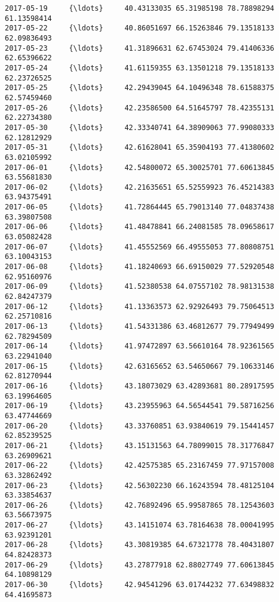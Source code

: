 \documentclass[11pt]{article}
\begin{document}
\begin{Verbatim}[commandchars=\\\{\}]
2017-05-19     {\ldots}     40.43133035 65.31985198 78.78898294 61.13598414   
2017-05-22     {\ldots}     40.86051697 66.15263846 79.13518133 62.09836493   
2017-05-23     {\ldots}     41.31896631 62.67453024 79.41406336 62.65396622   
2017-05-24     {\ldots}     41.61159355 63.13501218 79.13518133 62.23726525   
2017-05-25     {\ldots}     42.29439045 64.10496348 78.61588375 62.57459460   
2017-05-26     {\ldots}     42.23586500 64.51645797 78.42355131 62.22734380   
2017-05-30     {\ldots}     42.33340741 64.38909063 77.99080333 62.12812929   
2017-05-31     {\ldots}     42.61628041 65.35904193 77.41380602 63.02105992   
2017-06-01     {\ldots}     42.54800072 65.30025701 77.60613845 63.55681830   
2017-06-02     {\ldots}     42.21635651 65.52559923 76.45214383 63.94375491   
2017-06-05     {\ldots}     41.72864445 65.79013140 77.04837438 63.39807508   
2017-06-06     {\ldots}     41.48478841 66.24081585 78.09658617 63.05082428   
2017-06-07     {\ldots}     41.45552569 66.49555053 77.80808751 63.10043153   
2017-06-08     {\ldots}     41.18240693 66.69150029 77.52920548 62.95160976   
2017-06-09     {\ldots}     41.52380538 64.07557102 78.98131538 62.84247379   
2017-06-12     {\ldots}     41.13363573 62.92926493 79.75064513 62.25710816   
2017-06-13     {\ldots}     41.54331386 63.46812677 79.77949499 62.78294509   
2017-06-14     {\ldots}     41.97472897 63.56610164 78.92361565 63.22941040   
2017-06-15     {\ldots}     42.63165652 63.54650667 79.10633146 62.81270944   
2017-06-16     {\ldots}     43.18073029 63.42893681 80.28917595 63.19964605   
2017-06-19     {\ldots}     43.23955963 64.56544541 79.58716256 63.47744669   
2017-06-20     {\ldots}     43.33760851 63.93840619 79.15441457 62.85239525   
2017-06-21     {\ldots}     43.15131563 64.78099015 78.31776847 63.26909621   
2017-06-22     {\ldots}     42.42575385 65.23167459 77.97157008 63.32862492   
2017-06-23     {\ldots}     42.56302230 66.16243594 78.48125104 63.33854637   
2017-06-26     {\ldots}     42.76892496 65.99587865 78.12543603 63.56673975   
2017-06-27     {\ldots}     43.14151074 63.78164638 78.00041995 63.92391201   
2017-06-28     {\ldots}     43.30819385 64.67321778 78.40431807 64.82428373   
2017-06-29     {\ldots}     43.27877918 62.88027749 77.60613845 64.10898129   
2017-06-30     {\ldots}     42.94541296 63.01744232 77.63498832 64.41695873   


\end{Verbatim}
\end{document}
